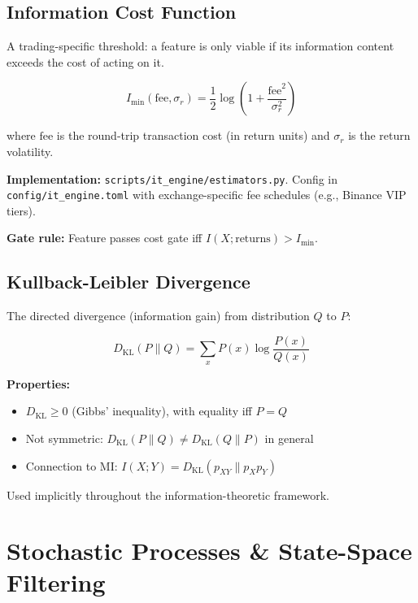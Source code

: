 \documentclass[11pt,a4paper]{article}
\begin{document}
\subsection{Information Cost Function}

A trading-specific threshold: a feature is only viable if its information content exceeds the cost of acting on it.

\begin{equation}
I_{\min}(\text{fee}, \sigma_r) = \frac{1}{2} \log\left(1 + \frac{\text{fee}^2}{\sigma_r^2}\right)
\end{equation}

where $\text{fee}$ is the round-trip transaction cost (in return units) and $\sigma_r$ is the return volatility.

\textbf{Implementation:} \texttt{scripts/it\_engine/estimators.py}. Config in \texttt{config/it\_engine.toml} with exchange-specific fee schedules (e.g., Binance VIP tiers).

\textbf{Gate rule:} Feature passes cost gate iff $I(X; \text{returns}) > I_{\min}$.

\subsection{Kullback-Leibler Divergence}

The directed divergence (information gain) from distribution $Q$ to $P$:

\begin{equation}
D_{\text{KL}}(P \| Q) = \sum_{x} P(x) \log \frac{P(x)}{Q(x)}
\end{equation}

\textbf{Properties:}
\begin{itemize}
    \item $D_{\text{KL}} \geq 0$ (Gibbs' inequality), with equality iff $P = Q$
    \item Not symmetric: $D_{\text{KL}}(P \| Q) \neq D_{\text{KL}}(Q \| P)$ in general
    \item Connection to MI: $I(X; Y) = D_{\text{KL}}(p_{XY} \| p_X p_Y)$
\end{itemize}

Used implicitly throughout the information-theoretic framework.

\newpage
\section{Stochastic Processes \& State-Space Filtering}
\end{document}
